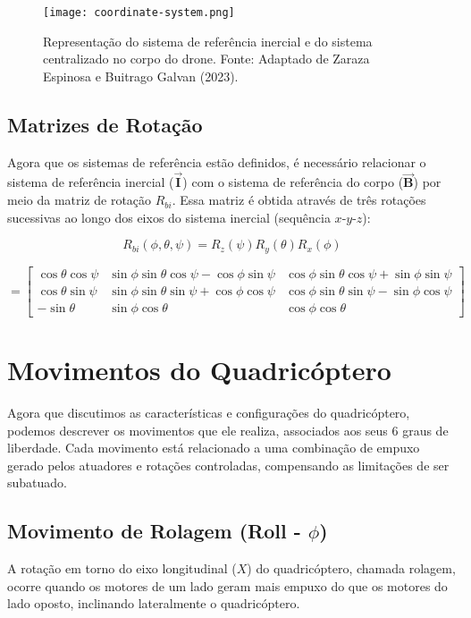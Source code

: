 \begin{figure}[H]
	\centering
	\texttt{[image: coordinate-system.png]}
	\caption{Representação do sistema de referência inercial e do sistema centralizado no corpo do drone. Fonte: Adaptado de Zaraza Espinosa e Buitrago Galvan (2023).}
	\label{fig:coordinate-system}
\end{figure}

\subsection{Matrizes de Rotação}
Agora que os sistemas de referência estão definidos, é necessário relacionar o sistema de referência inercial (\(\boldsymbol{\vec{I}}\)) com o sistema de referência do corpo (\(\boldsymbol{\vec{B}}\)) por meio da matriz de rotação \(R_{bi}\). Essa matriz é obtida através de três rotações sucessivas ao longo dos eixos do sistema inercial (sequência \(x\)-\(y\)-\(z\)):

\[
	R_{bi}(\phi,\theta,\psi) = R_z(\psi) R_y(\theta) R_x(\phi)
\]

\[
= \begin{bmatrix}
	\cos \theta \cos \psi & \sin \phi \sin \theta \cos \psi - \cos \phi \sin \psi & \cos \phi \sin \theta \cos \psi + \sin \phi \sin \psi \\
	\cos \theta \sin \psi & \sin \phi \sin \theta \sin \psi + \cos \phi \cos \psi & \cos \phi \sin \theta \sin \psi - \sin \phi \cos \psi \\
	-\sin \theta & \sin \phi \cos \theta & \cos \phi \cos \theta
\end{bmatrix}
\tag{1}
\]

\section{Movimentos do Quadricóptero}
Agora que discutimos as características e configurações do quadricóptero, podemos descrever os movimentos que ele realiza, associados aos seus 6 graus de liberdade. Cada movimento está relacionado a uma combinação de empuxo gerado pelos atuadores e rotações controladas, compensando as limitações de ser subatuado.

\subsection{Movimento de Rolagem (Roll - $\phi$)}
A rotação em torno do eixo longitudinal (\(X\)) do quadricóptero, chamada rolagem, ocorre quando os motores de um lado geram mais empuxo do que os motores do lado oposto, inclinando lateralmente o quadricóptero.


